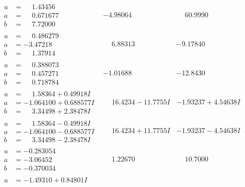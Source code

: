 \documentclass[1p]{elsarticle_modified}
\theoremstyle{definition}
\begin{document}
$$\begin{array}{c|c|c}
\begin{aligned}
u &= \phantom{-}1.43456\phantom{ +0.000000I} \\
a &= \phantom{-}0.671677\phantom{ +0.000000I} \\
b &= \phantom{-}7.72000\phantom{ +0.000000I}\end{aligned}
 & -4.98064\phantom{ +0.000000I} & \phantom{-}60.9990\phantom{ +0.000000I} \\ \hline\begin{aligned}
u &= \phantom{-}0.486279\phantom{ +0.000000I} \\
a &= -3.47218\phantom{ +0.000000I} \\
b &= \phantom{-}1.37914\phantom{ +0.000000I}\end{aligned}
 & \phantom{-}6.88313\phantom{ +0.000000I} & -9.17840\phantom{ +0.000000I} \\ \hline\begin{aligned}
u &= \phantom{-}0.388073\phantom{ +0.000000I} \\
a &= \phantom{-}0.457271\phantom{ +0.000000I} \\
b &= \phantom{-}0.718784\phantom{ +0.000000I}\end{aligned}
 & -1.01688\phantom{ +0.000000I} & -12.8430\phantom{ +0.000000I} \\ \hline\begin{aligned}
u &= \phantom{-}1.58364 + 0.49918 I \\
a &= -1.064100 + 0.688577 I \\
b &= \phantom{-}3.34498 + 2.38478 I\end{aligned}
 & \phantom{-}16.4234 - 11.7755 I & -1.93237 + 4.54638 I \\ \hline\begin{aligned}
u &= \phantom{-}1.58364 - 0.49918 I \\
a &= -1.064100 - 0.688577 I \\
b &= \phantom{-}3.34498 - 2.38478 I\end{aligned}
 & \phantom{-}16.4234 + 11.7755 I & -1.93237 - 4.54638 I \\ \hline\begin{aligned}
u &= -0.283054\phantom{ +0.000000I} \\
a &= -3.06452\phantom{ +0.000000I} \\
b &= -0.370034\phantom{ +0.000000I}\end{aligned}
 & \phantom{-}1.22670\phantom{ +0.000000I} & \phantom{-}10.7000\phantom{ +0.000000I} \\ \hline\begin{aligned}
u &= -1.49310 + 0.84801 I \\

\end{aligned}
\end{array}$$
\end{document}
